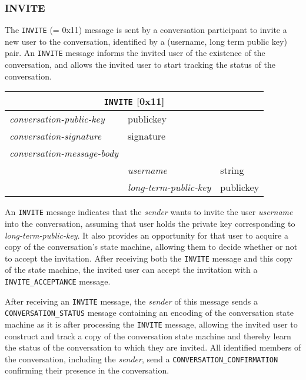 \documentclass{article}
\def\message#1{\texttt{#1}}
\def\field#1{\textit{#1}}
\def\type#1{\textsf{#1}}
\newenvironment{conversationmessage}[2]{
\newcommand{\messagefield}[2]{
& \field{##1} & \type{##2} \\
\hline
}
\hspace{2em minus 2em}\begin{tabular}{|l|l|l|}
\hline
\multicolumn{3}{|c|}{\message{#1} [#2]} \\
\hline
\hline
\field{conversation-public-key} & \multicolumn{2}{l|}{\type{publickey}} \\
\hline
\field{conversation-signature} & \multicolumn{2}{l|}{\type{signature}} \\
\hline
\field{conversation-message-body} & \multicolumn{2}{l|}{} \\
\hline
}{
\end{tabular}
}
\begin{document}
\subsubsection{INVITE}
\label{sec:messages/invite}

The \message{INVITE} (= 0x11) message is sent by a conversation participant to invite a new user to the conversation, identified by a (username, long term public key) pair.
An \message{INVITE} message informs the invited user of the existence of the conversation, and allows the invited user to start tracking the status of the conversation.

\begin{conversationmessage}{INVITE}{0x11}
\messagefield{username}{string}
\messagefield{long-term-public-key}{publickey}
\end{conversationmessage}

An \message{INVITE} message indicates that the \field{sender} wants to invite the user \field{username} into the conversation, assuming that user holds the private key corresponding to \field{long-term-public-key}.
It also provides an opportunity for that user to acquire a copy of the conversation's state machine, allowing them to decide whether or not to accept the invitation.
After receiving both the \message{INVITE} message and this copy of the state machine, the invited user can accept the invitation with a \message{INVITE\_ACCEPTANCE} message.

After receiving an \message{INVITE} message, the \field{sender} of this message sends a \message{CONVERSATION\_STATUS} message containing an encoding of the conversation state machine as it is after processing the \message{INVITE} message, allowing the invited user to construct and track a copy of the conversation state machine and thereby learn the status of the conversation to which they are invited.
All identified members of the conversation, including the \field{sender}, send a \message{CONVERSATION\_CONFIRMATION} confirming their presence in the conversation.
\end{document}
